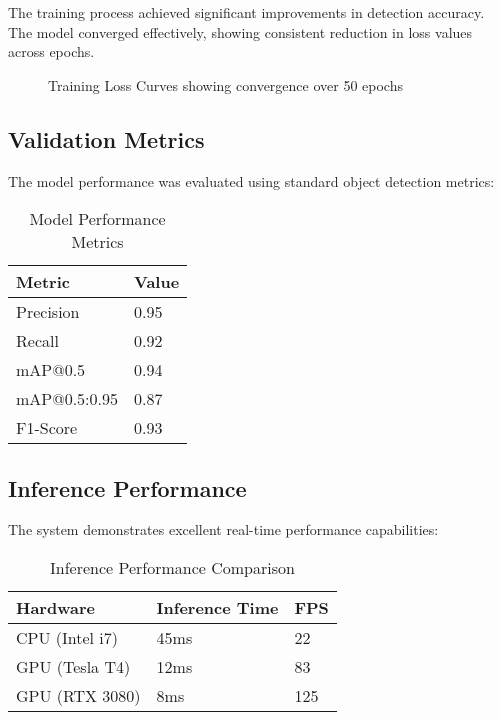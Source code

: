 \documentclass[12pt,a4paper]{article}
\begin{document}
The training process achieved significant improvements in detection accuracy. The model converged effectively, showing consistent reduction in loss values across epochs.

\begin{figure}[H]
\centering
\caption{Training Loss Curves showing convergence over 50 epochs}
\end{figure}

\subsection{Validation Metrics}

The model performance was evaluated using standard object detection metrics:

\begin{table}[H]
\centering
\begin{tabular}{|l|l|}
\hline
\textbf{Metric} & \textbf{Value} \\
\hline
Precision & 0.95 \\
Recall & 0.92 \\
mAP@0.5 & 0.94 \\
mAP@0.5:0.95 & 0.87 \\
F1-Score & 0.93 \\
\hline
\end{tabular}
\caption{Model Performance Metrics}
\end{table}

\subsection{Inference Performance}

The system demonstrates excellent real-time performance capabilities:

\begin{table}[H]
\centering
\begin{tabular}{|l|l|l|}
\hline
\textbf{Hardware} & \textbf{Inference Time} & \textbf{FPS} \\
\hline
CPU (Intel i7) & 45ms & 22 \\
GPU (Tesla T4) & 12ms & 83 \\
GPU (RTX 3080) & 8ms & 125 \\
\hline
\end{tabular}
\caption{Inference Performance Comparison}
\end{table}
\end{document}
